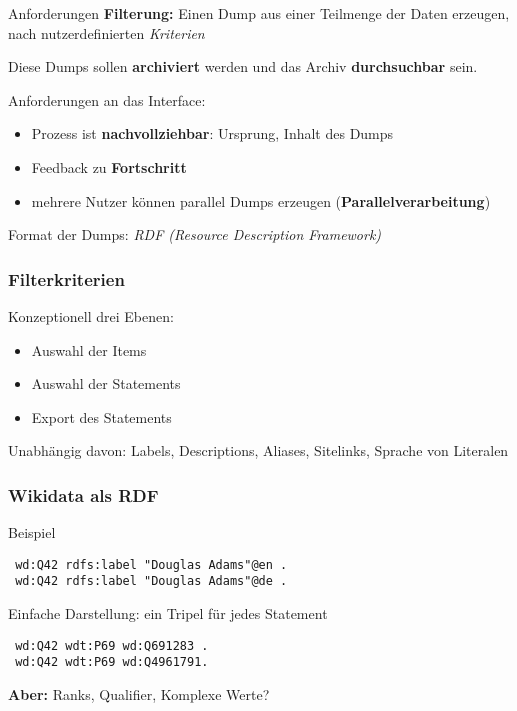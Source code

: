 \documentclass[aspectratio=1609,xcolor=usenames,dvipsnames,svgnames]{beamer}
\begin{document}
\begin{frame}{Anforderungen}
  \alert{\textbf{Filterung:}} Einen Dump aus einer Teilmenge der Daten erzeugen, nach
  nutzerdefinierten \emph{Kriterien}

  Diese Dumps sollen \textbf{archiviert} werden und das Archiv \textbf{durchsuchbar} sein.

  \pause

  Anforderungen an das Interface:
  \begin{itemize}
      \item Prozess ist \textbf{nachvollziehbar}: Ursprung, Inhalt des Dumps
      \item Feedback zu \textbf{Fortschritt}
      \item mehrere Nutzer können parallel Dumps erzeugen (\textbf{Parallelverarbeitung})
  \end{itemize}

  \pause

  Format der Dumps: \emph{RDF (Resource Description Framework)}
\end{frame}


\begin{frame}[label=current]\frametitle{Filterkriterien}
  Konzeptionell drei Ebenen:
  \begin{itemize}
    \item Auswahl der Items
    \item Auswahl der Statements
    \item Export des Statements
  \end{itemize}

  Unabhängig davon: Labels, Descriptions, Aliases, Sitelinks, Sprache von Literalen
\end{frame}


\begin{frame}[t, fragile]\frametitle{Wikidata als RDF}
  \vspace{0.25cm}

  \begin{block}{Beispiel}
  \begin{verbatim}
 wd:Q42 rdfs:label "Douglas Adams"@en .
 wd:Q42 rdfs:label "Douglas Adams"@de .
  \end{verbatim}
  \end{block}

  \begin{block}{Einfache Darstellung: ein Tripel für jedes Statement}
  \begin{verbatim}
 wd:Q42 wdt:P69 wd:Q691283 .
 wd:Q42 wdt:P69 wd:Q4961791.
  \end{verbatim}
  \end{block}

  \textbf{Aber:} Ranks, Qualifier, Komplexe Werte?
\end{frame}
\end{document}
